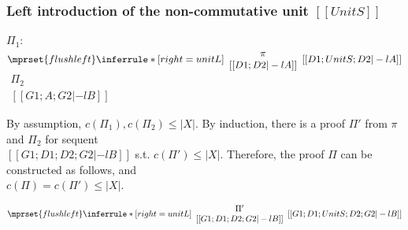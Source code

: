 \subsubsection{Left introduction of the non-commutative unit $[[UnitS]]$}
\begin{center}
  \scriptsize
  $\Pi_1$:
  \begin{math}
    $$\mprset{flushleft}
    \inferrule* [right={\tiny unitL}] {
      {
        \begin{array}{c}
          \pi \\
          {[[D1; D2 |-l A]]}
        \end{array}
      }
    }{[[D1; UnitS; D2 |-l A]]}
  \end{math}
  \qquad\qquad
  \begin{math}
    \begin{array}{c}
      \Pi_2 \\
      {[[G1; A; G2 |-l B]]}
    \end{array}
  \end{math}
\end{center}
By assumption, $c(\Pi_1),c(\Pi_2)\leq |X|$. By induction, there is a
proof $\Pi'$ from $\pi$ and $\Pi_2$ for sequent \\
$[[G1; D1; D2; G2 |-l B]]$ s.t. $c(\Pi')\leq |X|$. Therefore, the proof
$\Pi$ can be constructed as follows, and \\
$c(\Pi)=c(\Pi')\leq |X|$.
\begin{center}
  \scriptsize
  \begin{math}
    $$\mprset{flushleft}
    \inferrule* [right={\tiny unitL}] {
      {
        \begin{array}{c}
          \Pi' \\
          {[[G1; D1; D2; G2 |-l B]]}
        \end{array}
      }
    }{[[G1; D1; UnitS; D2; G2 |-l B]]}
  \end{math}
\end{center}



